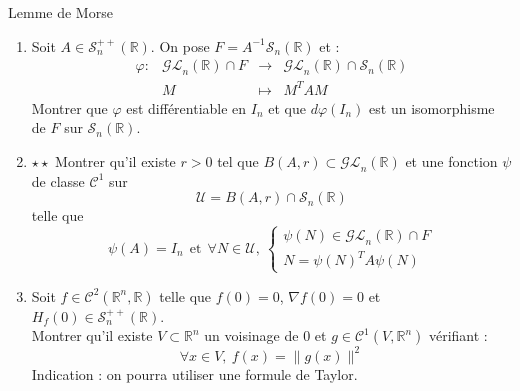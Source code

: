 \documentclass[french]{book}
\newcommand{\R}{\mathbb{R}}
\newcommand{\inv}{^{-1}}
\theoremstyle{definition}
\theoremstyle{remark}
\begin{document}
\begin{exo}[3]{Lemme de Morse}
	\begin{enumerate}
		\item Soit $A\in\mathcal{S}_n^{++}(\R)$. On pose $F=A\inv\mathcal{S}_n(\R)$ et : $$\begin{array}{lrcl}
			\varphi:&\mathcal{GL}_n(\R)\cap F&\longrightarrow&\mathcal{GL}_n(\R)\cap\mathcal{S}_n(\R)\\
			&M&\longmapsto&M^TAM
		\end{array}$$ Montrer que $\varphi$ est différentiable en $I_n$ et que $d\varphi(I_n)$ est un isomorphisme de $F$ sur $\mathcal{S}_n(\R)$.
		\item $\star\star$ Montrer qu'il existe $r>0$ tel que $B(A,r)\subset\mathcal{GL}_n(\R)$ et une fonction $\psi$ de classe $\mathcal{C}^1$ sur $$\mathcal{U}=B(A,r)\cap\mathcal{S}_n(\R)$$ telle que $$\psi(A)=I_n\ \ \text{et}\ \ \forall N\in \mathcal{U},\ \begin{cases}
			\psi(N)\in\mathcal{GL}_n(\R)\cap F\\
			N=\psi(N)^TA\psi(N)
		\end{cases}$$
		\item Soit $f\in\mathcal{C}^2(\R^n,\R)$ telle que $f(0)=0$, $\nabla f(0)=0$ et $H_f(0)\in\mathcal{S}_n^{++}(\R)$. \\
		Montrer qu'il existe $V\subset\R^n$ un voisinage de $0$ et $g\in\mathcal{C}^1(V,\R^n)$ vérifiant : $$\forall x\in V,\ f(x)=\lVert g(x)\rVert^2$$ Indication : on pourra utiliser une formule de Taylor.
	\end{enumerate}
\end{exo}
\end{document}
